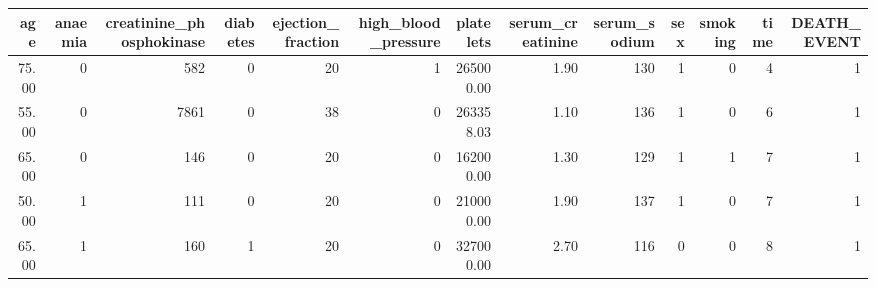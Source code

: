 \begin{table}[ht]
\centering
\begin{tabular}{rrrrrrrrrrrrr}
  \hline
age & anaemia & creatinine\_phosphokinase & diabetes & ejection\_fraction & high\_blood\_pressure & platelets & serum\_creatinine & serum\_sodium & sex & smoking & time & DEATH\_EVENT \\ 
  \hline
75.00 &   0 & 582 &   0 &  20 &   1 & 265000.00 & 1.90 & 130 &   1 &   0 &   4 &   1 \\ 
  55.00 &   0 & 7861 &   0 &  38 &   0 & 263358.03 & 1.10 & 136 &   1 &   0 &   6 &   1 \\ 
  65.00 &   0 & 146 &   0 &  20 &   0 & 162000.00 & 1.30 & 129 &   1 &   1 &   7 &   1 \\ 
  50.00 &   1 & 111 &   0 &  20 &   0 & 210000.00 & 1.90 & 137 &   1 &   0 &   7 &   1 \\ 
  65.00 &   1 & 160 &   1 &  20 &   0 & 327000.00 & 2.70 & 116 &   0 &   0 &   8 &   1 \\ 
   \hline
\end{tabular}
\end{table}
